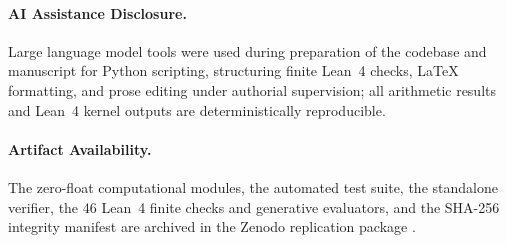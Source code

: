 \documentclass[11pt,a4paper]{amsart}
\theoremstyle{definition}
\theoremstyle{remark}
\begin{document}
\paragraph{AI Assistance Disclosure.} Large language model tools were used during preparation of the codebase and manuscript for Python scripting, structuring finite Lean~4 checks, LaTeX formatting, and prose editing under authorial supervision; all arithmetic results and Lean~4 kernel outputs are deterministically reproducible.

\paragraph{Artifact Availability.} The zero-float computational modules, the automated test suite, the standalone verifier, the $46$ Lean~4 finite checks and generative evaluators, and the SHA-256 integrity manifest are archived in the Zenodo replication package \cite{MunawerHodgeZenodo2026}.



\end{document}
